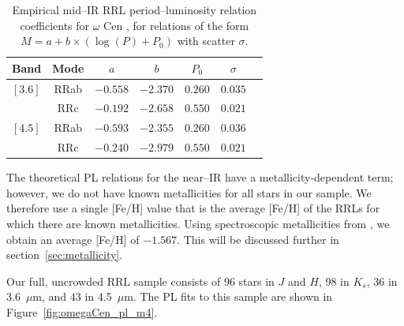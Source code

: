 \documentclass[a4paper,fleqn,usenatbib]{mnras}
\begin{document}
\begin{table}
\centering
\caption{Empirical mid--IR RRL period--luminosity relation coefficients for $\omega$ Cen \citep{2015arXiv150507858N}, for relations of the form $M = a + b \times (\log (P) + P_0)$ with scatter $\sigma$.} 
\label{tab:pl_table_m4}
\begin{tabular}{l||c|c|c|c|c|r} 
\hline \hline
Band & Mode & $a$ & $b$ & $P_0$ & $\sigma$ \\
\hline
$[3.6]$ & RRab & $-0.558$ & $-2.370$ & $0.260$ & $0.035$ \\
            & RRc & $-0.192$ & $-2.658$ & $0.550$ & $0.021$ \\
$[4.5]$ & RRab & $-0.593$ & $-2.355$ & $0.260$ & $0.036$ \\
            & RRc & $-0.240$ & $-2.979$ & $0.550$ & $0.021$ \\ 
            \hline
\end{tabular}
\end{table}


The theoretical PL relations for the near--IR have a metallicity-dependent term; however, we do not have known metallicities for all stars in our sample. We therefore use a single [Fe/H] value that is the average [Fe/H] of the RRLs for which there are known metallicities. Using spectroscopic metallicities from \citet{2006ApJ...640L..43S}, we obtain an average [Fe/H] of $-1.567$. This will be discussed further in section~\ref{sec:metallicity}.



Our full, uncrowded RRL sample consists of 96 stars in $J$ and $H$, 98 in $K_s$, 36 in 3.6~$\mu$m, and 43 in 4.5~$\mu$m. The PL fits to this sample are shown in Figure~\ref{fig:omegaCen_pl_m4}.
\end{document}
